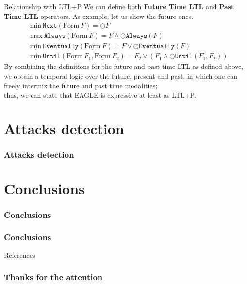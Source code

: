 \documentclass[aspectratio=169,t,xcolor=table]{beamer}
\begin{document}
\begin{frame}{Relationship with LTL+P}
    We can define both \textbf{Future Time LTL} and \textbf{Past Time LTL} operators. As example, let us show the future ones.
    \begin{align*}
        & \underline{\text{min}}\ \mathtt{Next}(\underline{\text{Form}}\ F) = \bigcirc F \\
        & \underline{\text{max}}\ \mathtt{Always}(\underline{\text{Form}}\ F) = F \land \bigcirc \mathtt{Always}(F) \\
        & \underline{\text{min}}\ \mathtt{Eventually}(\underline{\text{Form}}\ F) = F \lor \bigcirc \mathtt{Eventually}(F) \\
        & \underline{\text{min}}\ \mathtt{Until}(\underline{\text{Form}}\ F_1, \underline{\text{Form}}\ F_2) = F_2 \lor (F_1 \land \bigcirc \mathtt{Until}(F_1,F_2))
    \end{align*}
    By combining the definitions for the future and past time LTL as defined above, we obtain a temporal logic over the future, present and past, in which one can freely intermix the future and past time modalities;\\thus, we can state that EAGLE is expressive at least as LTL+P.

\end{frame}

\section{Attacks detection}
\begin{frame}{}
    \frametitle{Attacks detection}
\end{frame}



\section{Conclusions}
\begin{frame}{}
    \frametitle{Conclusions}
\end{frame}


\begin{frame}
    \frametitle{Conclusions}

\end{frame}

\begin{frame}[allowframebreaks]{References}
    \nocite{*} 
    \printbibliography
\end{frame}

\begin{frame}{}
    \frametitle{Thanks for the attention}
\end{frame}
\end{document}
